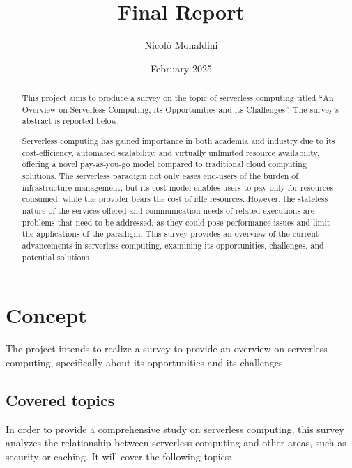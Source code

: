 \documentclass{scrartcl}
\title{\LARGE
    Final Report
}
\author{
    Nicolò Monaldini \\ \emailaddr{nicolo.monaldini@studio.unibo.it}
}
\date{February 2025}
\begin{document}
\maketitle

\begin{abstract}
    This project aims to produce a survey on the topic of serverless computing titled ``An Overview on Serverless Computing, its Opportunities and its Challenges''. The survey's abstract is reported below: 
    
    Serverless computing has gained importance in both academia and industry due to its cost-efficiency, automated scalability, and virtually unlimited resource availability, offering a novel pay-as-you-go model compared to traditional cloud computing solutions. The serverless paradigm not only eases end-users of the burden of infrastructure management, but its cost model enables users to pay only for resources consumed, while the provider bears the cost of idle resources. However, the stateless nature of the services offered and communication needs of related executions are problems that need to be addressed, as they could pose performance issues and limit the applications of the paradigm. This survey provides an overview of the current advancements in serverless computing, examining its opportunities, challenges, and potential solutions. 
\end{abstract}

\newpage
\section{Concept}\label{concept}

The project intends to realize a survey to provide an overview on serverless computing, specifically about its opportunities and its challenges.

\subsection{Covered topics}

In order to provide a comprehensive study on serverless computing, this survey analyzes the relationship between serverless computing and other areas, such as security or caching. It will cover the following topics:
\end{document}
